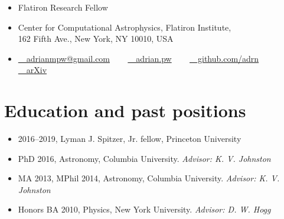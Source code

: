 \documentclass[12pt, letterpaper]{apw-cv}
\begin{document}
\thispagestyle{empty}\sloppy\sloppypar




\begin{itemize}
  \item Flatiron Research Fellow
  \item Center for Computational Astrophysics, Flatiron Institute, \\ 162 Fifth Ave., New York, NY 10010, USA
  \item
    \href{mailto:adrianmpw@gmail.com}{\faEnvelope~~adrianmpw@gmail.com}
    ~~~
	\href{http://adrian.pw}{\faExternalLink~~adrian.pw}
    ~~~
	\href{https://github.com/adrn}{\faGithub~~github.com/adrn}
    ~~~
    \href{\arxivurl}{~~arXiv}
\end{itemize}




\section*{Education and past positions}
	\begin{itemize}
        \item 2016--2019, Lyman J. Spitzer, Jr. fellow, Princeton University
	\item PhD 2016, Astronomy, Columbia University.
		{\it Advisor: K. V. Johnston}
	\item MA 2013, MPhil 2014, Astronomy, Columbia University.
		{\it Advisor: K. V. Johnston}
	\item Honors BA 2010, Physics, New York University.
		{\it Advisor: D. W. Hogg}
	\end{itemize}
\end{document}
